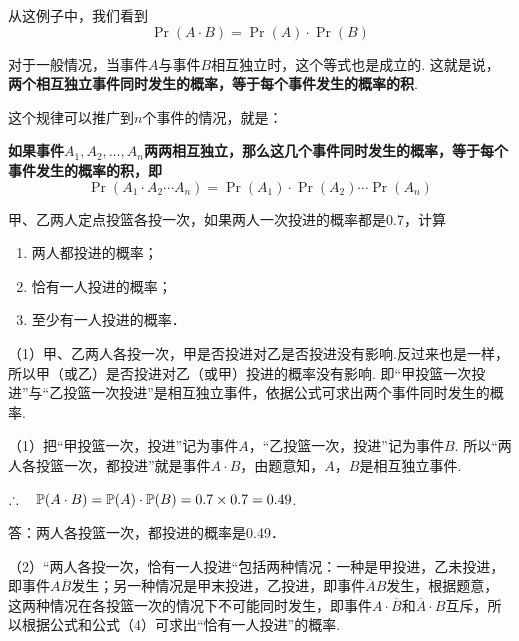 从这例子中，我们看到
\begin{equation}
    \Pr(A\cdot B)=\Pr(A)\cdot \Pr(B)\tag{4}
\end{equation}

对于一般情况，当事件$A$与事件$B$相互独立时，这个等式也是成立的. 这就是说，\textbf{两个相互独立事件同时发生的概率，等于每个事件发生的概率的积}.

这个规律可以推广到$n$个事件的情况，就是：

\textbf{如果事件$A_1,A_2,\ldots,A_n$两两相互独立，那么这几个事件同时发生的概率，等于每个事件发生的概率的积，即}
\begin{equation}
    \Pr(A_1\cdot A_2\cdots A_n)=\Pr(A_1)\cdot \Pr(A_2)\cdots\Pr(A_n)  \tag{$4'$}    
\end{equation}

\begin{example}
甲、乙两人定点投篮各投一次，如果两人一次投进的概率都是0.7，计算
\begin{enumerate}[(1)]
 \item 两人都投进的概率；  
 \item 恰有一人投进的概率；
\item 至少有一人投进的概率．    
\end{enumerate}
 
\end{example}

\begin{analyze}
（1）甲、乙两人各投一次，甲是否投进对乙是否投进没有影响.反过来也是一样，所以甲（或乙）是否投进对乙（或甲）投进的概率没有影响. 即“甲投篮一次投进”与“乙投篮一次投进”是相互独立事件，依据公式可求出两个事件同时发生的概率.    
\end{analyze}

\begin{solution}
（1）把“甲投篮一次，投进”记为事件$A$，“乙投篮一次，投进”记为事件$B$. 所以“两人各投篮一次，都投进”就是事件$A\cdot B$，由题意知，$A$，$B$是相互独立事件. 

$\therefore\quad \mathbb{P}(A\cdot B)=\mathbb{P}(A)\cdot \mathbb{P}(B)
=0.7\times0.7=0.49$.

答：两人各投篮一次，都投进的概率是0.49．
\end{solution}

\begin{analyze}
（2）“两人各投一次，恰有一人投进“包括两种情况：一种是甲投进，乙未投进，即事件$A\overline{B}$发生；另一种情况是甲末投进，乙投进，即事件$\overline{A}B$发生，根据题意，这两种情况在各投篮一次的情况下不可能同时发生，即事件$A\cdot \overline{B}$和$\overline{A}\cdot B$互斥，所以根据公式和公式（4）可求出“恰有一人投进”的概率.
\end{analyze}

